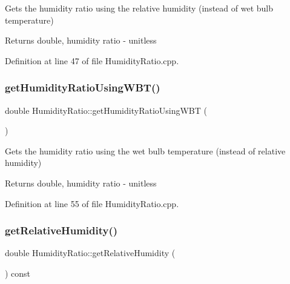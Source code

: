 Gets the humidity ratio using the relative humidity (instead of wet bulb temperature)

\begin{DoxyReturn}{Returns}
double, humidity ratio -\/ unitless 
\end{DoxyReturn}


Definition at line 47 of file Humidity\+Ratio.\+cpp.

\mbox{\label{class_humidity_ratio_ad33fa981783bae96c17171f12b9cf2bd}} 
\subsubsection{\texorpdfstring{get\+Humidity\+Ratio\+Using\+W\+B\+T()}{getHumidityRatioUsingWBT()}}
{\footnotesize\ttfamily double Humidity\+Ratio\+::get\+Humidity\+Ratio\+Using\+W\+BT (\begin{DoxyParamCaption}{ }\end{DoxyParamCaption})}

Gets the humidity ratio using the wet bulb temperature (instead of relative humidity)

\begin{DoxyReturn}{Returns}
double, humidity ratio -\/ unitless 
\end{DoxyReturn}


Definition at line 55 of file Humidity\+Ratio.\+cpp.

\mbox{\label{class_humidity_ratio_af761b52e96bdf995e1a2bbbfd9e3b47f}} 
\subsubsection{\texorpdfstring{get\+Relative\+Humidity()}{getRelativeHumidity()}}
{\footnotesize\ttfamily double Humidity\+Ratio\+::get\+Relative\+Humidity (\begin{DoxyParamCaption}{ }\end{DoxyParamCaption}) const\hspace{0.3cm}{\ttfamily [inline]}}

